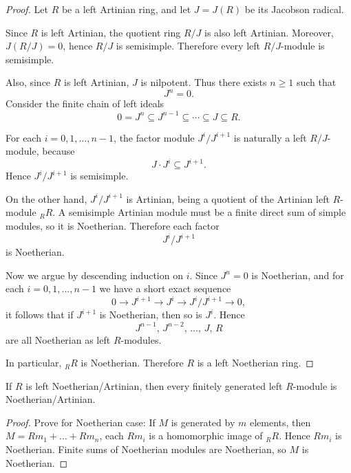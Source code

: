 \begin{proof}
    Let $R$ be a left Artinian ring, and let $J=J(R)$ be its Jacobson radical.

    Since $R$ is left Artinian, the quotient ring $R/J$ is also left Artinian. Moreover,
    $J(R/J)=0$, hence $R/J$ is semisimple. Therefore every left $R/J$-module is
    semisimple.

    Also, since $R$ is left Artinian, $J$ is nilpotent. Thus there exists $n\ge 1$ such
    that
    \[
        J^n=0.
    \]
    Consider the finite chain of left ideals
    \[
        0=J^n \subseteq J^{n-1} \subseteq \cdots \subseteq J \subseteq R.
    \]

    For each $i=0,1,\dots,n-1$, the factor module $J^i/J^{i+1}$ is naturally a left
    $R/J$-module, because
    \[
        J\cdot J^i \subseteq J^{i+1}.
    \]
    Hence $J^i/J^{i+1}$ is semisimple.

    On the other hand, $J^i/J^{i+1}$ is Artinian, being a quotient of the Artinian
    left $R$-module ${}_R R$. A semisimple Artinian module must be a finite direct sum
    of simple modules, so it is Noetherian. Therefore each factor
    \[
        J^i/J^{i+1}
    \]
    is Noetherian.

    Now we argue by descending induction on $i$. Since $J^n=0$ is Noetherian, and for
    each $i=0,1,\dots,n-1$ we have a short exact sequence
    \[
        0 \longrightarrow J^{i+1} \longrightarrow J^i \longrightarrow J^i/J^{i+1}
        \longrightarrow 0,
    \]
    it follows that if $J^{i+1}$ is Noetherian, then so is $J^i$. Hence
    \[
        J^{n-1},\,J^{n-2},\,\dots,\,J,\,R
    \]
    are all Noetherian as left $R$-modules.

    In particular, ${}_R R$ is Noetherian. Therefore $R$ is a left Noetherian ring.
\end{proof}

\begin{theorem}
    If $R$ is left Noetherian/Artinian, then every finitely generated left $R$-module is Noetherian/Artinian.
\end{theorem}

\begin{proof}
    Prove for Noetherian case: If $M$ is generated by $m$ elements, then $M=Rm_1+ \ldots + Rm_n$, each $Rm_i$ is a homomorphic image of ${}_RR$. Hence $Rm_i$ is Noetherian.
    Finite sums of Noetherian modules are Noetherian, so $M$ is Noetherian.
\end{proof}

